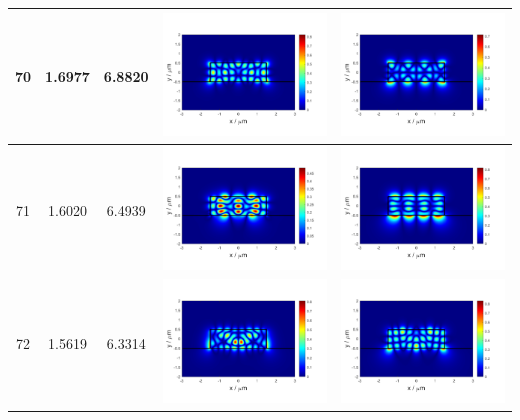\documentclass{assignment}
\begin{document}
\begin{sol}
\begin{itemize}
\begin{longtable}[c]{|c|c|c|c|c|}
            70 & 1.6977 & 6.8820 & \includegraphics[width=.3\columnwidth]{Assignment-2-mode-70-Ex.png} & \includegraphics[width=.3\columnwidth]{Assignment-2-mode-70-Ey.png} \\ \hline
            71 & 1.6020 & 6.4939 & \includegraphics[width=.3\columnwidth]{Assignment-2-mode-71-Ex.png} & \includegraphics[width=.3\columnwidth]{Assignment-2-mode-71-Ey.png} \\ \hline
            72 & 1.5619 & 6.3314 & \includegraphics[width=.3\columnwidth]{Assignment-2-mode-72-Ex.png} & \includegraphics[width=.3\columnwidth]{Assignment-2-mode-72-Ey.png} \\ \hline

\end{longtable}
\end{itemize}
\end{sol}
\end{document}
